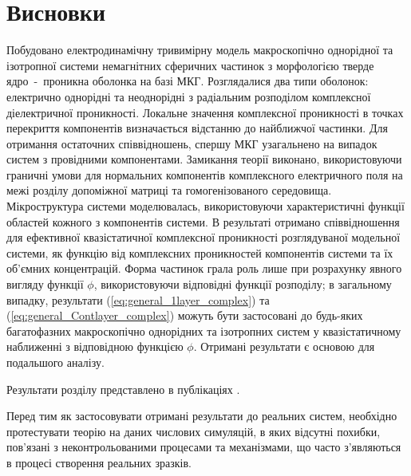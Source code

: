 \documentclass[14pt,twoside]{vakthesis}
\begin{document}
\section{Висновки}

Побудовано електродинамічну тривимірну модель макроскопічно однорідної та ізотропної системи немагнітних сферичних частинок з морфологією тверде ядро~-~проникна оболонка на базі МКГ. Розглядалися два типи оболонок: електрично однорідні та неоднорідні з радіальним розподілом комплексної діелектричної проникності. Локальне значення комплексної проникності в точках перекриття компонентів визначається відстанню до найближчої частинки. 
Для отримання остаточних співвідношень, спершу МКГ узагальнено на випадок систем з провідними компонентами. Замикання теорії виконано, використовуючи граничні умови для нормальних компонентів комплексного електричного поля на межі розділу допоміжної матриці та гомогенізованого середовища. 
Мікроструктура системи моделювалась, використовуючи характеристичні функції областей кожного з компонентів системи.
В результаті отримано співвідношення для ефективної квазістатичної комплексної проникності розглядуваної модельної системи, як функцію від комплексних проникностей компонентів системи та їх об'ємних концентрацій.
Форма частинок грала роль лише при розрахунку явного вигляду функції $\phi$, використовуючи відповідні функції розподілу; в загальному випадку, результати (\ref{eq:general_1layer_complex}) та (\ref{eq:general_Contlayer_complex}) можуть бути застосовані до будь-яких багатофазних макроскопічно однорідних та ізотропних систем у квазістатичному наближенні з відповідною функцією $\phi$.
Отримані результати є основою для подальшого аналізу.

Результати розділу представлено в публікаціях \cite{Sushko2013,Sushko2018PRE}.

Перед тим як застосовувати отримані результати до реальних систем, необхідно протестувати теорію на даних числових симуляцій, в яких відсутні похибки, пов'язані з неконтрольованими процесами та механізмами, що часто з'являються в процесі створення реальних зразків.

\end{document}
